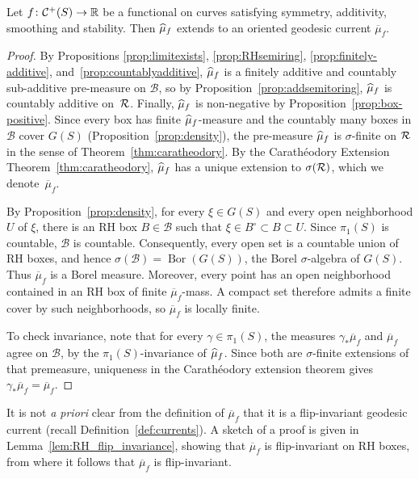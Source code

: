 \begin{proposition}
Let $f \colon \mathcal{C}^+(S) \to \mathbb{R}$ be a functional on curves satisfying symmetry, additivity, smoothing and stability.
Then $\widehat{\mu}_f$ extends to an oriented geodesic current $\overline\mu_f$.
\end{proposition}
\begin{proof}
By Propositions \ref{prop:limitexists}, \ref{prop:RHsemiring},
\ref{prop:finitely-additive}, and~\ref{prop:countablyadditive}, $\widehat{\mu}_f$
is a finitely
additive and countably sub-additive pre-measure on $\mathcal{B}$, so
by Proposition~\ref{prop:addsemitoring},
$\widehat{\mu}_f$ is countably additive on~$\mathcal{R}$.
 Finally, $\widehat{\mu}_f$ is non-negative by
Proposition~\ref{prop:box-positive}. Since every box has finite $\widehat{\mu}_f$-measure and the countably many
boxes in $\mathcal B$ cover $G(S)$ (Proposition~\ref{prop:density}),
the pre-measure $\widehat{\mu}_f$ is $\sigma$-finite on $\mathcal{R}$ in the sense of
Theorem~\ref{thm:caratheodory}.
By the Carath\'eodory
Extension Theorem~\ref{thm:caratheodory}, $\widehat{\mu}_f$ has a unique
extension to $\sigma(\mathcal{R})$, which we denote~$\overline\mu_f$.

By Proposition~\ref{prop:density}, for every
$\xi\in G(S)$ and every open neighborhood $U$ of $\xi$, there
is an RH box $B\in\mathcal B$ such that
$\xi\in B^\circ\subset B\subset U.$
Since $\pi_1(S)$ is countable, $\mathcal B$ is countable. Consequently,
every open set is a countable union of RH boxes, and hence
$\sigma(\mathcal B)=\operatorname{Bor}(G(S))$, the Borel
$\sigma$-algebra of $G(S)$.
Thus $\overline\mu_f$ is a Borel measure.
Moreover, every point has an open neighborhood contained in an RH box
of finite $\overline\mu_f$-mass. A compact set therefore admits a finite
cover by such neighborhoods, so $\overline\mu_f$ is locally finite. 

To check invariance, note that for every $\gamma\in\pi_1(S)$, the measures
$\gamma_*\overline\mu_f$ and $\overline\mu_f$ agree on $\mathcal B$, by the
$\pi_1(S)$-invariance of $\widehat{\mu}_f$. Since both are
$\sigma$-finite extensions of that premeasure, uniqueness in the
Carath\'eodory extension theorem gives
$\gamma_*\overline\mu_f=\overline\mu_f.$
\end{proof}

It is not \emph{a priori} clear from the definition of
$\overline\mu_f$ that it is a flip-invariant geodesic current
(recall
Definition~\ref{def:currents}). A sketch of a proof is given in Lemma~\ref{lem:RH_flip_invariance}, showing that $\overline \mu_f$ is flip-invariant on RH boxes, from where it follows that $\overline \mu_f$ is flip-invariant.

